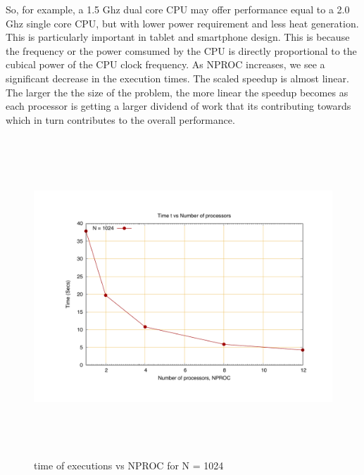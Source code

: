 \documentclass[fleqn,letterpaper,12pt]{report}
\begin{document}
So, for example, a 1.5 Ghz dual core CPU may offer performance equal to a 2.0 Ghz single core CPU, but with lower power requirement and less heat generation. This is particularly important in tablet and smartphone design. This is because the frequency or the power comsumed by the CPU is directly proportional to the cubical power of the CPU clock frequency.
\newpage
As NPROC increases, we see a significant decrease in the execution times. The scaled speedup is almost linear. The larger the the size of the problem, the more linear the speedup becomes as each processor is getting a larger dividend of work that its contributing towards which in turn contributes to the overall performance. 
\begin{figure}[htbp]
	\centering
	\includegraphics[height=120mm,width=160mm]{1024.pdf}
	\caption{time of executions vs NPROC for N = 1024\label{overflow}}
\end{figure}
\end{document}

